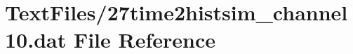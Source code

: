 \hypertarget{27time2histsim__channel10_8dat}{}\section{Text\+Files/27time2histsim\+\_\+channel10.dat File Reference}
\label{27time2histsim__channel10_8dat}
